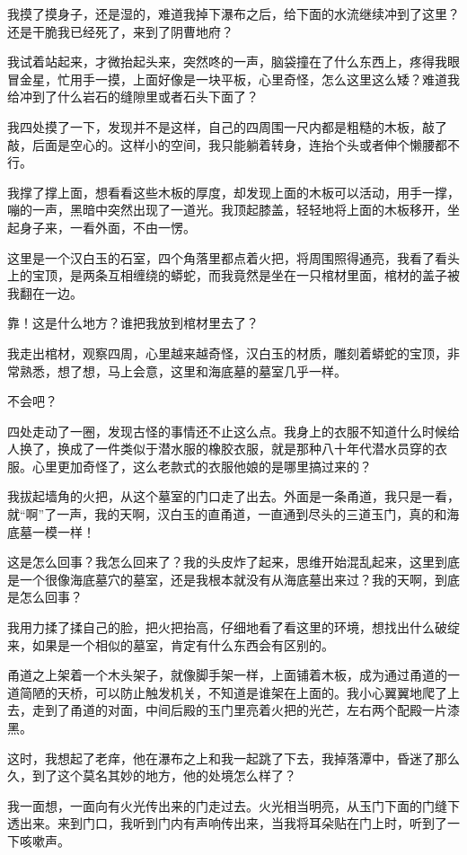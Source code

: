 我摸了摸身子，还是湿的，难道我掉下瀑布之后，给下面的水流继续冲到了这里？还是干脆我已经死了，来到了阴曹地府？

我试着站起来，才微抬起头来，突然咚的一声，脑袋撞在了什么东西上，疼得我眼冒金星，忙用手一摸，上面好像是一块平板，心里奇怪，怎么这里这么矮？难道我给冲到了什么岩石的缝隙里或者石头下面了？

我四处摸了一下，发现并不是这样，自己的四周围一尺内都是粗糙的木板，敲了敲，后面是空心的。这样小的空间，我只能躺着转身，连抬个头或者伸个懒腰都不行。

我撑了撑上面，想看看这些木板的厚度，却发现上面的木板可以活动，用手一撑，嘣的一声，黑暗中突然出现了一道光。我顶起膝盖，轻轻地将上面的木板移开，坐起身子来，一看外面，不由一愣。

这里是一个汉白玉的石室，四个角落里都点着火把，将周围照得通亮，我看了看头上的宝顶，是两条互相缠绕的蟒蛇，而我竟然是坐在一只棺材里面，棺材的盖子被我翻在一边。

靠！这是什么地方？谁把我放到棺材里去了？

我走出棺材，观察四周，心里越来越奇怪，汉白玉的材质，雕刻着蟒蛇的宝顶，非常熟悉，想了想，马上会意，这里和海底墓的墓室几乎一样。

不会吧？

四处走动了一圈，发现古怪的事情还不止这么点。我身上的衣服不知道什么时候给人换了，换成了一件类似于潜水服的橡胶衣服，就是那种八十年代潜水员穿的衣服。心里更加奇怪了，这么老款式的衣服他娘的是哪里搞过来的？

我拔起墙角的火把，从这个墓室的门口走了出去。外面是一条甬道，我只是一看，就“啊”了一声，我的天啊，汉白玉的直甬道，一直通到尽头的三道玉门，真的和海底墓一模一样！

这是怎么回事？我怎么回来了？我的头皮炸了起来，思维开始混乱起来，这里到底是一个很像海底墓穴的墓室，还是我根本就没有从海底墓出来过？我的天啊，到底是怎么回事？

我用力揉了揉自己的脸，把火把抬高，仔细地看了看这里的环境，想找出什么破绽来，如果是一个相似的墓室，肯定有什么东西会有区别的。

甬道之上架着一个木头架子，就像脚手架一样，上面铺着木板，成为通过甬道的一道简陋的天桥，可以防止触发机关，不知道是谁架在上面的。我小心翼翼地爬了上去，走到了甬道的对面，中间后殿的玉门里亮着火把的光芒，左右两个配殿一片漆黑。

这时，我想起了老痒，他在瀑布之上和我一起跳了下去，我掉落潭中，昏迷了那么久，到了这个莫名其妙的地方，他的处境怎么样了？

我一面想，一面向有火光传出来的门走过去。火光相当明亮，从玉门下面的门缝下透出来。来到门口，我听到门内有声响传出来，当我将耳朵贴在门上时，听到了一下咳嗽声。

